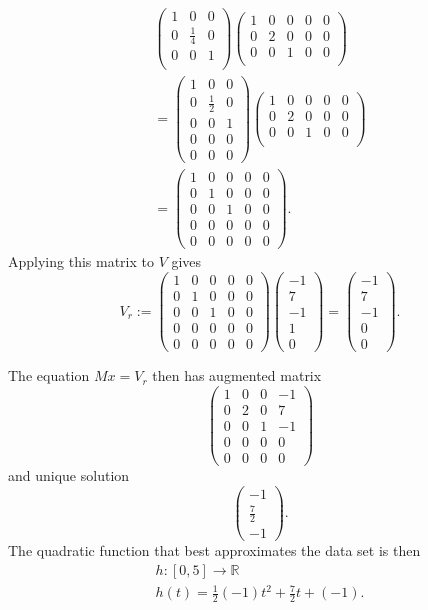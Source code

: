 \documentclass[12pt]{article}
\def\bv{\left(\begin{array}{c}}
\def\ev{\end{array}\right) }
\begin{document}
\begin{gather*}
\left( \begin{array}{rrr}
1 &0&0\\
0      &\frac14&0\\
0&0&1\\
\end{array} \right)
\left( \begin{array}{rrrrr}
1 &0&0&0&0\\
0      &2&0&0&0\\
0&0&1&0&0\\
\end{array} \right)
\\= 
\left( \begin{array}{rrr}
1 &0&0\\
0      &\frac12&0\\
0&0&1\\
0&0&0\\
0&0&0
\end{array} \right)
\left( \begin{array}{rrrrr}
1 &0&0&0&0\\
0      &2&0&0&0\\
0&0&1&0&0\\
\end{array} \right)
\\= 
\left( \begin{array}{rrrrr}
1 &0&0&0&0\\
0      &1&0&0&0\\
0&0&1&0&0\\
0&0&0&0&0\\
0&0&0&0&0
\end{array} \right).
\end{gather*}
Applying this matrix to $V$ gives 
\[
V_r:=\left( \begin{array}{rrrrr}
1 &0&0&0&0\\
0      &1&0&0&0\\
0&0&1&0&0\\
0&0&0&0&0\\
0&0&0&0&0
\end{array} \right) 
\bv -1\\7\\-1\\1\\0 \ev 
=
\bv -1\\7\\-1\\0\\0 \ev.
\]

The equation $Mx=V_r$ then has augmented matrix 
\[
\left( \begin{array}{rrr|r}
1 &0&0&-1\\
0      &2&0&7\\
0&0&1&-1\\
0&0&0&0\\
0&0&0&0
\end{array} \right)
\]
and unique solution 
\[\bv -1\\ \frac72 \\-1 \ev. \]
The quadratic function that best approximates the data set is then 
\begin{gather*} h:[0,5] \to \mathbb{R}\\
h(t)=\frac12 (-1) t^2 +\frac72 t +(-1).\end{gather*}
\end{document}
